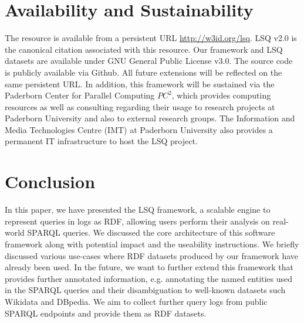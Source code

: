 \section{Availability and Sustainability}
The resource is available from a persistent URL \url{http://w3id.org/lsq}. LSQ v2.0 \cite{stadleralsq} is the canonical citation associated with this resource. Our framework and LSQ datasets are available under GNU General Public License v3.0. The source code is publicly available via Github. 
All future extensions will be reflected on the same persistent URL. In addition, this framework will be sustained via the Paderborn Center for Parallel Computing $PC^2$, which provides computing resources as well as consulting regarding their usage to research projects at Paderborn University and also to external research groups. The Information and Media Technologies Centre (IMT) at Paderborn University also provides a permanent IT infrastructure to host the LSQ project.

\section{Conclusion}
In this paper, we have presented the LSQ framework, a scalable engine to represent queries in logs as RDF, allowing users perform their analysis on real-world SPARQL queries. We discussed the core architecture of this software framework along with potential impact and the useability instructions. We briefly discussed various use-cases where RDF datasets produced by our framework have already been used. In the future, we want to further extend this framework that provides further annotated information, e.g. annotating the named entities used in the SPARQL queries and their disambiguation to well-known datasets such Wikidata and DBpedia. We aim to collect further query logs from public SPARQL endpoints and provide them as RDF datasets. 




